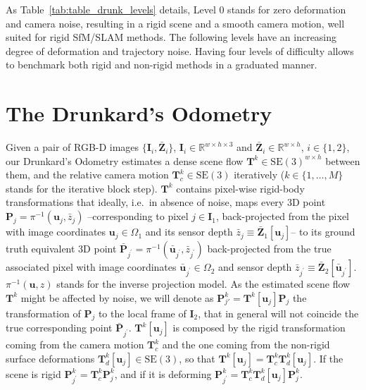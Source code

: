 \documentclass{article}
\begin{document}
As Table~\ref{tab:table_drunk_levels} details, Level 0 stands for zero deformation and camera noise, resulting in a rigid scene and a smooth camera motion, well suited for rigid SfM/SLAM methods. 
The following levels have an increasing degree of deformation and trajectory noise. Having four levels of difficulty allows to benchmark both rigid and non-rigid methods in a graduated manner.


\section{The Drunkard's Odometry}  \label{sec:drunkSLAM}
Given a pair of RGB-D images $\{\mathbf{I}_i, \bar{\mathbf{Z}}_i\}$, $\mathbf{I}_i \in \mathbb{R}^{w \times h \times 3}$ and $\bar{\mathbf{Z}}_i \in \mathbb{R}^{w \times h}$, $i \in \{1, 2 \}$, our Drunkard's Odometry estimates a dense scene flow $\mathbf{T}^k \in \ensuremath{\mathrm{SE}(3)^{w \times h}}$ between them, and the relative camera motion $\mathbf{T}_c^k \in \ensuremath{\mathrm{SE}(3)}$ iteratively ($k \in \{1, \dots, M\}$ stands for the iterative block step). 
$\mathbf{T}^k$ contains pixel-wise rigid-body transformations that ideally, i.e.\ in absence of noise, maps every 3D point $\mathbf{P}_j = \pi^{-1}\left( \mathbf{u}_j, \bar{z}_j \right)$ --corresponding to pixel $j \in \mathbf{I}_1$, back-projected from the pixel with image coordinates $\mathbf{u}_j \in \Omega_1$ and its sensor depth $\bar{z}_j\equiv \bar{\mathbf{Z}}_1[\mathbf{u}_j]$-- to its ground truth equivalent 3D point $\bar{\mathbf{P}}_{j^\prime} = \pi^{-1}\left( \bar{\mathbf{u}}_{j^\prime}, \bar{z}_{j^\prime} \right)$ back-projected from the true associated pixel with image coordinates $\bar{\mathbf{u}}_{j^\prime} \in \Omega_2$ and sensor depth $\bar{z}_{j^\prime} \equiv \bar{\mathbf{Z}}_2[\bar{\mathbf{u}}_{j^\prime}]$. $\pi^{-1}\left( \mathbf{u}, z \right)$ stands for the inverse projection model. As the estimated scene flow $\mathbf{T}^k$ might be affected by noise, we will denote as $\mathbf{P}_{j\prime}^k = \mathbf{T}^k\left[\mathbf{u}_j\right] \mathbf{P}_j$
the transformation of $\mathbf{P}_j$ to the local frame of $\mathbf{I}_2$, that in general will not coincide the true corresponding point $\bar{\mathbf{P}}_{j^\prime}$. $\mathbf{T}^k\left[\mathbf{u}_j\right]$ is composed by the rigid transformation coming from the camera motion $\mathbf{T}_c^k$ and the one coming from the non-rigid surface deformations $\mathbf{T}_{d}^k\left[\mathbf{u}_j\right] \in \mathrm{SE}(3)$, so that $\mathbf{T}^k \left[\mathbf{u}_j\right]= \mathbf{T}_c^k  \mathbf{T}_{d}^k\left[\mathbf{u}_j\right]$. If the scene is rigid $\mathbf{P}_{j^\prime}^k = \mathbf{T}_c^k\mathbf{P}_j^k$, and if it is deforming $\mathbf{P}_{j^\prime}^k = \mathbf{T}_c^k\mathbf{T}_d^k\left[\mathbf{u}_j\right]\mathbf{P}_j^k$. 
\end{document}
